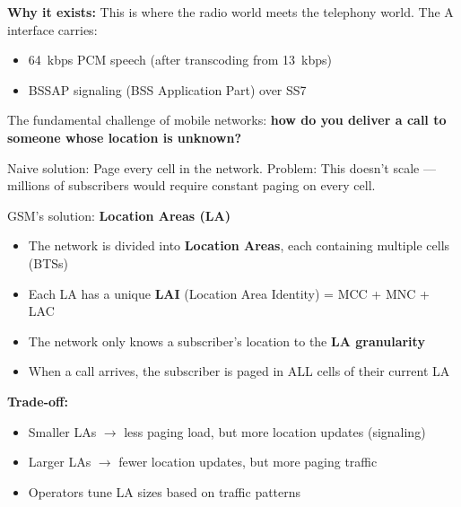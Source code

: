 
\textbf{Why it exists:} This is where the radio world meets the telephony world. The A interface carries:

\begin{itemize}
\tightlist
\item
  64~kbps PCM speech (after transcoding from 13~kbps)
\item
  BSSAP signaling (BSS Application Part) over SS7
\end{itemize}



\CNchained{}

The fundamental challenge of mobile networks: \textbf{how do you deliver a call to someone whose location is unknown?}

Naive solution: Page every cell in the network. Problem: This doesn’t scale — millions of subscribers would require constant paging on every cell.

GSM’s solution: \textbf{Location Areas (LA)}


\begin{itemize}
\tightlist
\item
  The network is divided into \textbf{Location Areas}, each containing multiple cells (BTSs)
\item
  Each LA has a unique \textbf{LAI} (Location Area Identity) = MCC + MNC + LAC
\item
  The network only knows a subscriber’s location to the \textbf{LA granularity}
\item
  When a call arrives, the subscriber is paged in ALL cells of their current LA
\end{itemize}

\textbf{Trade-off:}

\begin{itemize}
\tightlist
\item
  Smaller LAs \ensuremath{\to} less paging load, but more location updates (signaling)
\item
  Larger LAs \ensuremath{\to} fewer location updates, but more paging traffic
\item
  Operators tune LA sizes based on traffic patterns
\end{itemize}

